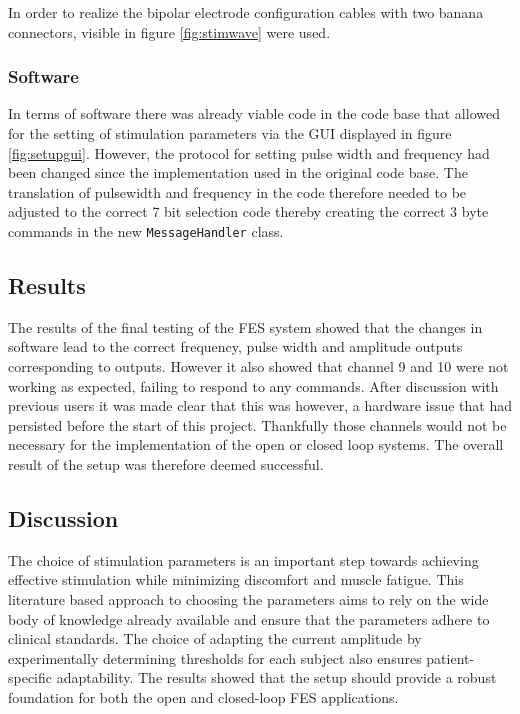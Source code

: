 In order to realize the bipolar electrode configuration cables with two banana connectors, visible in figure \ref{fig:stimwave} were used. 

\subsubsection{Software}
In terms of software there was already viable code in the code base that allowed for the setting of stimulation parameters via the GUI displayed in figure \ref{fig:setupgui}. However, the protocol for setting pulse width and frequency had been changed since the implementation used in the original code base. The translation of pulsewidth and frequency in the code therefore needed to be adjusted to the correct 7 bit selection code thereby creating the correct 3 byte commands in the new \texttt{MessageHandler} class.

\subsection{Results}
The results of the final testing of the FES system showed that the changes in software lead to the correct frequency, pulse width and amplitude outputs corresponding to outputs. However it also showed that channel 9 and 10 were not working as expected, failing to respond to any commands. After discussion with previous users it was made clear that this was however, a hardware issue that had persisted before the start of this project. Thankfully those channels would not be necessary for the implementation of the open or closed loop systems. The overall result of the setup was therefore deemed successful.

\subsection{Discussion}
The choice of stimulation parameters is an important step towards achieving effective stimulation while minimizing discomfort and muscle fatigue. This literature based approach to choosing the parameters aims to rely on the wide body of knowledge already available and ensure that the parameters adhere to clinical standards. The choice of adapting the current amplitude by experimentally determining thresholds for each subject also ensures patient-specific adaptability. The results showed that the setup should provide a robust foundation for both the open and closed-loop FES applications.

